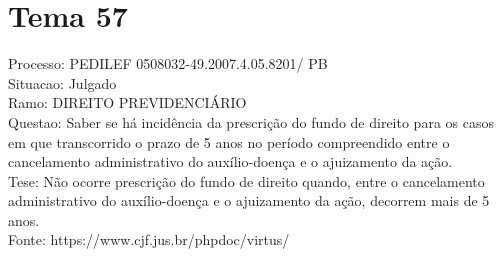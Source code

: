 \documentclass[12pt]{article}
\begin{document}
\section*{Tema 57}
Processo: PEDILEF 0508032-49.2007.4.05.8201/ PB\\
Situacao: Julgado\\
Ramo: DIREITO PREVIDENCIÁRIO\\
Questao: Saber se há incidência da prescrição do fundo de direito para os casos em que transcorrido o prazo de 5 anos no período compreendido entre o cancelamento administrativo do auxílio-doença e o ajuizamento da ação.\\
Tese: Não ocorre prescrição do fundo de direito quando, entre o cancelamento administrativo do auxílio-doença e o ajuizamento da ação, decorrem mais de 5 anos.\\
Fonte: https://www.cjf.jus.br/phpdoc/virtus/
\end{document}
